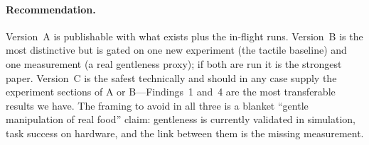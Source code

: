 \paragraph{Recommendation.} Version~A is publishable with what exists plus the in-flight runs.
Version~B is the most distinctive but is gated on one new experiment (the tactile baseline)
and one measurement (a real gentleness proxy); if both are run it is the strongest paper.
Version~C is the safest technically and should in any case supply the experiment sections of
A or B---Findings~1 and~4 are the most transferable results we have. The framing to avoid in
all three is a blanket ``gentle manipulation of real food'' claim: gentleness is currently
validated in simulation, task success on hardware, and the link between them is the missing
measurement.
